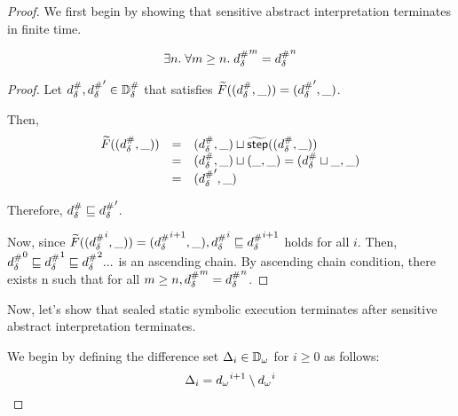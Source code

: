 \begin{proof}
We first begin by showing that sensitive abstract interpretation terminates in
finite time.

\begin{lemma}
\label{theorem:sabs-termination}
  \[
    \exists n. \; \forall m \geq n. \;
    {{d}^{\#}_\delta}^m = {{d}^{\#}_\delta}^n
  \]
\end{lemma}

\begin{proof}
Let ${{d}^{\#}_\delta}, {{d}^{\#}_\delta}' \in {\mathbb{D}}^{\#}_\delta$ that satisfies
$\widetilde{F}(({{d}^{\#}_\delta}, \_)) = ({{d}^{\#}_\delta}', \_)$.

Then,
\[
  \begin{array}{rcl}
  \widetilde{F}(({{d}^{\#}_\delta}, \_))
  &=& ({{d}^{\#}_\delta}, \_) \sqcup \widetilde{\textsf{step}}(({{d}^{\#}_\delta}, \_))\\
  &=& ({{d}^{\#}_\delta}, \_) \sqcup (\_, \_) = ({{d}^{\#}_\delta} \sqcup \_, \_)\\
  &=& ({{d}^{\#}_\delta}', \_)
  \end{array}
\]

Therefore, ${{d}^{\#}_\delta} \sqsubseteq {{d}^{\#}_\delta}'$.

Now, since $\widetilde{F}(({{d}^{\#}_\delta}^i, \_)) = ({{d}^{\#}_\delta}^{i+1}, \_),
{{d}^{\#}_\delta}^i \sqsubseteq {{d}^{\#}_\delta}^{i+1}$ holds for all $i$.
Then, ${{d}^{\#}_\delta}^0 \sqsubseteq {{d}^{\#}_\delta}^1 \sqsubseteq {{d}^{\#}_\delta}^2 ...$ is an ascending chain.
By ascending chain condition, there exists n such that
for all $m \geq n, {{d}^{\#}_\delta}^m = {{d}^{\#}_\delta}^n$.
\end{proof}

Now, let's show that sealed static symbolic execution terminates after
sensitive abstract interpretation terminates.

We begin by defining the difference set $\Delta_i \in {\mathbb{D}}_\omega$ for $i \geq 0$ as follows:
\[
  \Delta_i = {{d}_\omega}^{i+1} \setminus {{d}_\omega}^i
\]


\end{proof}
